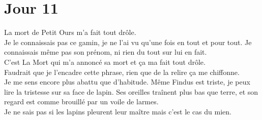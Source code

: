 \chapter*{Jour 11}
La mort de Petit Ours m'a fait tout drôle. \\
Je le connaissais pas ce gamin, je ne l'ai vu qu'une fois en tout et pour tout. Je connaissais même pas son prénom, ni rien du tout sur lui en fait. \\
C'est La Mort qui m'a annoncé sa mort et ça ma fait tout drôle. \\

Faudrait que je l'encadre cette phrase, rien que de la relire ça me chiffonne. \\

Je me sens encore plus abattu que d'habitude. Même Findus est triste, je peux lire la tristesse sur sa face de lapin. Ses oreilles traînent plus bas que terre, et son regard est comme brouillé par un voile de larmes. \\
Je ne sais pas si les lapins pleurent leur maître mais c'est le cas du mien.
